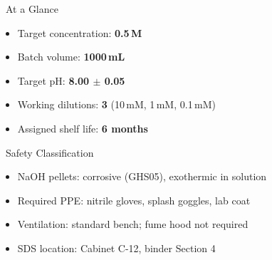 \vspace{2pt}
\noindent
\begin{minipage}[t]{0.48\textwidth}
\begin{calcbox}{\faFlask\ At a Glance}
\begin{itemize}[leftmargin=1.4em, itemsep=2pt, topsep=2pt]
  \item Target concentration: \textbf{0.5\,M}
  \item Batch volume: \textbf{1000\,mL}
  \item Target pH: \textbf{8.00 $\pm$ 0.05}
  \item Working dilutions: \textbf{3} (10\,mM, 1\,mM, 0.1\,mM)
  \item Assigned shelf life: \textbf{6 months}
\end{itemize}
\end{calcbox}
\end{minipage}\hfill
\begin{minipage}[t]{0.48\textwidth}
\begin{hazardbox}{\faExclamationTriangle\ Safety Classification}
\begin{itemize}[leftmargin=1.4em, itemsep=2pt, topsep=2pt]
  \item NaOH pellets: corrosive (GHS05), exothermic in solution
  \item Required PPE: nitrile gloves, splash goggles, lab coat
  \item Ventilation: standard bench; fume hood not required
  \item SDS location: Cabinet C-12, binder Section 4
\end{itemize}
\end{hazardbox}
\end{minipage}
\par

